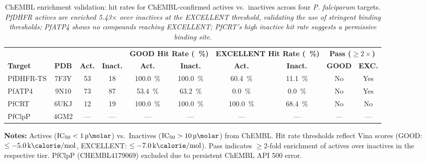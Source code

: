 \documentclass[journal=jcisd8,manuscript=suppinfo]{achemso}
\begin{document}
\begin{table}[ht]
\centering
\caption{ChEMBL enrichment validation: hit rates for ChEMBL-confirmed actives vs.\ inactives across four \emph{P. falciparum} targets. \textit{PfDHFR actives are enriched 5.43$\times$ over inactives at the EXCELLENT threshold, validating the use of stringent binding thresholds; PfATP4 shows no compounds reaching EXCELLENT; PfCRT's high inactive hit rate suggests a permissive binding site.}}
\label{tab:sm_s18b_chembl_enrichment}
\scriptsize
\begin{tabular}{lccccccccc}
\toprule
& & & & \multicolumn{2}{c|}{\textbf{GOOD Hit Rate (\qty{}{\percent})}} & \multicolumn{2}{c|}{\textbf{EXCELLENT Hit Rate (\qty{}{\percent})}} & \multicolumn{2}{c}{\textbf{Pass ($\geq \num{2}\times$)}} \\
\textbf{Target} & \textbf{PDB} & \textbf{Act.} & \textbf{Inact.} & \textbf{Act.} & \textbf{Inact.} & \textbf{Act.} & \textbf{Inact.} & \textbf{GOOD} & \textbf{EXC.} \\
\midrule
PfDHFR-TS & 7F3Y & \num{53} & \num{18} & \qty{100.0}{\percent} & \qty{100.0}{\percent} & \qty{60.4}{\percent} & \qty{11.1}{\percent} & No & Yes \\
PfATP4 & 9N10 & \num{73} & \num{87} & \qty{53.4}{\percent} & \qty{63.2}{\percent} & \qty{0.0}{\percent} & \qty{0.0}{\percent} & No & Yes \\
PfCRT & 6UKJ & \num{12} & \num{19} & \qty{100.0}{\percent} & \qty{100.0}{\percent} & \qty{100.0}{\percent} & \qty{68.4}{\percent} & No & No \\
PfClpP & 4GM2 & --- & --- & --- & --- & --- & --- & --- & --- \\
\bottomrule
\end{tabular}
\end{table}

\noindent\textbf{Notes:} Actives ($\text{IC}_{\num{50}} < \qty{1}{\micro\molar}$) vs.\ Inactives ($\text{IC}_{\num{50}} > \qty{10}{\micro\molar}$) from ChEMBL. Hit rate thresholds reflect Vina scores (GOOD: $\leq \qty{-5.0}{\kilo\calorie\per\mole}$, EXCELLENT: $\leq \qty{-7.0}{\kilo\calorie\per\mole}$). Pass indicates $\geq \num{2}$-fold enrichment of actives over inactives in the respective tier. PfClpP (CHEMBL4179069) excluded due to persistent ChEMBL API 500 error.
\end{document}
